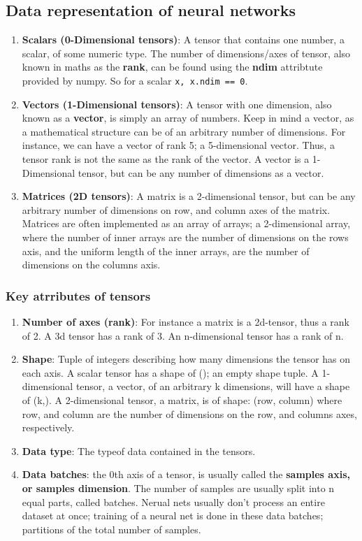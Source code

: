 \documentclass[12pt, a4paper]{article}
\begin{document}
\subsection{Data representation of neural networks}
\begin{enumerate}
   \item \textbf{Scalars (0-Dimensional tensors)}: A tensor that contains one number,
   a scalar, of some numeric type. The number of dimensions/axes of tensor, also known in maths
   as the \textbf{rank}, can be found using the \textbf{ndim} attribtute provided by numpy.
   So for a scalar  \lstinline{x, x.ndim == 0}.
   \item \textbf{Vectors (1-Dimensional tensors)}: A tensor with one dimension, also known as a \textbf{vector},
   is simply an array of numbers. Keep in mind a vector, as a mathematical structure can be of an arbitrary
   number of dimensions. For instance, we can have a vector of rank 5; a 5-dimensional vector. Thus,
   a tensor rank is not the same as the rank of the vector. A vector is a 1-Dimensional tensor, but can be any number of dimensions
   as a vector.
   \item \textbf{Matrices (2D tensors)}: A matrix is a 2-dimensional tensor,
   but can be any arbitrary number of dimensions on row, and column axes of the matrix.
   Matrices are often implemented as an array of arrays; a 2-dimensional array, where
   the number of inner arrays are the number of dimensions on the rows axis, and the uniform length of the inner arrays,
   are the number of dimensions on the columns axis.
\end{enumerate}

\subsubsection{Key atrributes of tensors}
\begin{enumerate}
   \item \textbf{Number of axes (rank)}: For instance a matrix is a 2d-tensor, thus a rank of 2.
   A 3d tensor has a rank of 3. An n-dimensional tensor has a rank of n.
   \item \textbf{Shape}: Tuple of integers describing how many dimensions the tensor has
   on each axis. A scalar tensor has a shape of (); an empty shape tuple. A
   1-dimensional tensor, a vector, of an arbitrary k dimensions, will have a shape of (k,).
   A 2-dimensional tensor, a matrix, is of shape: (row, column) where row, and column are the
   number of dimensions on the row, and columns axes, respectively.
   \item \textbf{Data type}: The typeof data contained in the tensors.
   \item \textbf{Data batches}: the 0th axis of a tensor, is usually called the 
   \textbf{samples axis, or samples dimension}. The number of samples are usually split into 
   n equal parts, called batches. Nerual nets usually don't process an entire dataset at once; training of a neural net 
   is done in these data batches; partitions of the total number of samples.
\end{enumerate}
\end{document}
